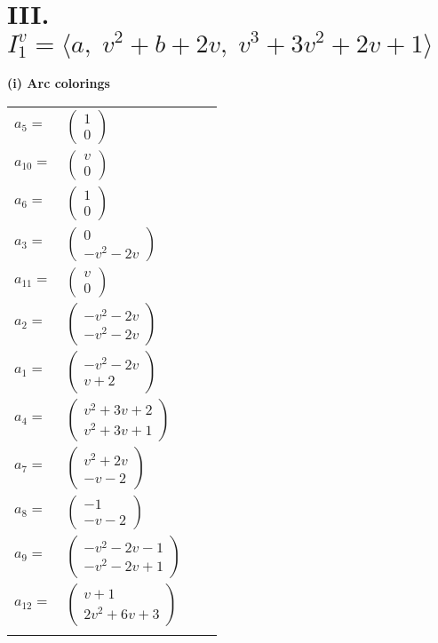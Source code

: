 \documentclass[1p]{elsarticle_modified}
\theoremstyle{definition}
\begin{document}
\centering \section*{III. $I^v_{1}= \langle a,\;v^2+b+2 v,\;v^3+3 v^2+2 v+1 \rangle$}
\flushleft \textbf{(i) Arc colorings}\\
\begin{tabular}{m{7pt} m{180pt} m{7pt} m{180pt} }
\flushright $a_{5}=$&$\begin{pmatrix}1\\0\end{pmatrix}$ \\
\flushright $a_{10}=$&$\begin{pmatrix}v\\0\end{pmatrix}$ \\
\flushright $a_{6}=$&$\begin{pmatrix}1\\0\end{pmatrix}$ \\
\flushright $a_{3}=$&$\begin{pmatrix}0\\- v^2-2 v\end{pmatrix}$ \\
\flushright $a_{11}=$&$\begin{pmatrix}v\\0\end{pmatrix}$ \\
\flushright $a_{2}=$&$\begin{pmatrix}- v^2-2 v\\- v^2-2 v\end{pmatrix}$ \\
\flushright $a_{1}=$&$\begin{pmatrix}- v^2-2 v\\v+2\end{pmatrix}$ \\
\flushright $a_{4}=$&$\begin{pmatrix}v^2+3 v+2\\v^2+3 v+1\end{pmatrix}$ \\
\flushright $a_{7}=$&$\begin{pmatrix}v^2+2 v\\- v-2\end{pmatrix}$ \\
\flushright $a_{8}=$&$\begin{pmatrix}-1\\- v-2\end{pmatrix}$ \\
\flushright $a_{9}=$&$\begin{pmatrix}- v^2-2 v-1\\- v^2-2 v+1\end{pmatrix}$ \\
\flushright $a_{12}=$&$\begin{pmatrix}v+1\\2 v^2+6 v+3\end{pmatrix}$\\&\end{tabular}
\end{document}
